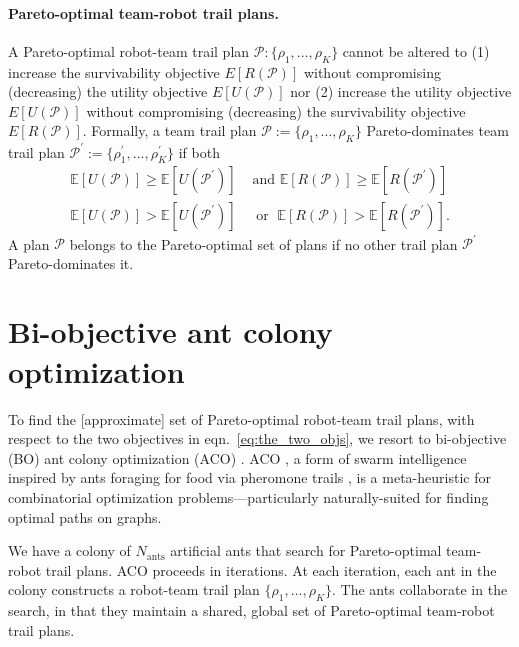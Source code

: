 \documentclass[11pt, oneside]{article}
\begin{document}
\paragraph{Pareto-optimal team-robot trail plans.} 
A Pareto-optimal robot-team trail plan $\mathcal{P}:\{\rho_1, ..., \rho_K\}$ cannot be altered to
(1) increase the survivability objective $E[R(\mathcal{P})]$ without compromising (decreasing) the utility objective $E[U(\mathcal{P})]$
nor
(2) increase the utility objective $E[U(\mathcal{P})]$ without compromising (decreasing) the survivability objective $E[R(\mathcal{P})]$.
Formally, a team trail plan $\mathcal{P}:=\{\rho_1, ..., \rho_K\}$ Pareto-dominates team trail plan  $\mathcal{P}^\prime :=\{\rho_1^\prime, ..., \rho_K^\prime\}$ if both
\begin{align}
	\mathbb{E}[U(\mathcal{P})] \geq \mathbb{E}[U(\mathcal{P}^\prime)] & \text{ and }  \mathbb{E}[R(\mathcal{P})] \geq \mathbb{E}[R(\mathcal{P}^\prime)] \\
	\mathbb{E}[U(\mathcal{P})] > \mathbb{E}[U(\mathcal{P}^\prime)] & \; \text{ or   } \; \mathbb{E}[R(\mathcal{P})] > \mathbb{E}[R(\mathcal{P}^\prime)].
\end{align}
A plan $\mathcal{P}$ belongs to the Pareto-optimal set of plans if no other trail plan $\mathcal{P}^\prime$ Pareto-dominates it.



\section{Bi-objective ant colony optimization}
To find the [approximate] set of Pareto-optimal robot-team trail plans, with respect to the two objectives in eqn.~\ref{eq:the_two_objs}, we resort to bi-objective (BO) ant colony optimization (ACO) \cite{iredi2001bi}. 
ACO \cite{dorigo2006ant}, a form of swarm intelligence \cite{bonabeau1999swarm} inspired by ants foraging for food via pheromone trails \cite{bonabeau2000inspiration}, is a meta-heuristic for combinatorial optimization problems---particularly naturally-suited for finding optimal paths on graphs. 

We have a colony of $N_{\text{ants}}$ artificial ants that search for Pareto-optimal team-robot trail plans. 
ACO proceeds in iterations. 
At each iteration, each ant in the colony constructs a robot-team trail plan $\{\rho_1, ..., \rho_K\}$. 
The ants collaborate in the search, in that they maintain a shared, global set of Pareto-optimal team-robot trail plans.
\end{document}

